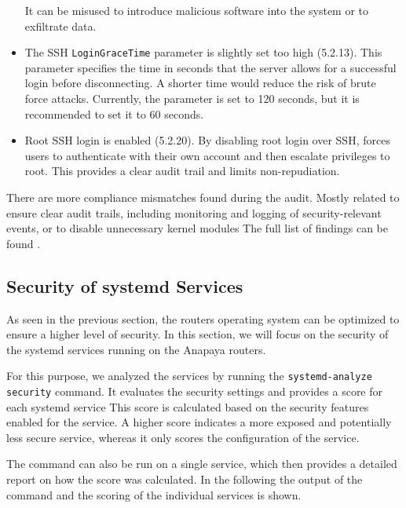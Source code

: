 \begin{itemize}
    It can be misused to introduce malicious software into the system or to exfiltrate data.
    \item The SSH \texttt{LoginGraceTime} parameter is slightly set too high (5.2.13).
    This parameter specifies the time in seconds that the server allows for a successful login before disconnecting.
    A shorter time would reduce the risk of brute force attacks.
    Currently, the parameter is set to 120 seconds, but it is recommended to set it to 60 seconds.
    \item Root SSH login is enabled (5.2.20).
    By disabling root login over SSH, forces users to authenticate with their own account and then escalate privileges to root.
    This provides a clear audit trail and limits non-repudiation.
\end{itemize}


There are more compliance mismatches found during the audit.
Mostly related to ensure clear audit trails, including monitoring and logging of security-relevant events, or to disable unnecessary kernel modules
The full list of findings can be found .

\subsection{Security of systemd Services}
As seen in the previous section, the routers operating system can be optimized to ensure a higher level of security.
In this section, we will focus on the security of the systemd services running on the Anapaya routers.

For this purpose, we analyzed the services by running the \texttt{systemd-analyze security} command.
It evaluates the security settings and provides a score for each systemd service
This score is calculated based on the security features enabled for the service.
A higher score indicates a more exposed and potentially less secure service, whereas it only scores the configuration of the service.

The command can also be run on a single service, which then provides a detailed report on how the score was calculated.
In the following the output of the command and the scoring of the individual services is shown.



